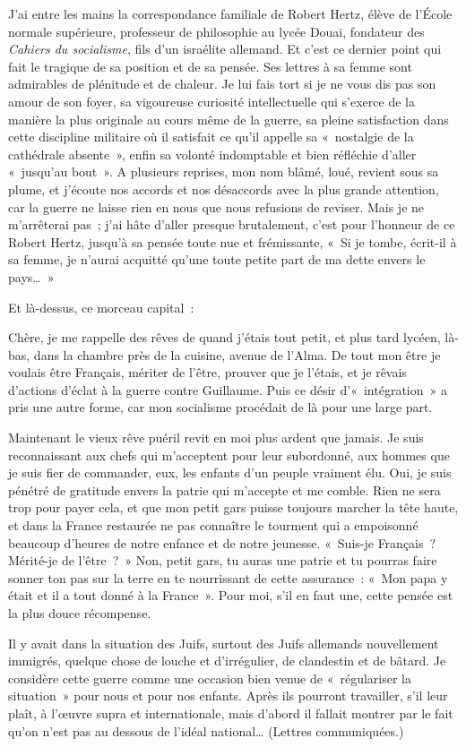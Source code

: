 \documentclass[french,twoside]{book} %
\newenvironment{quoteblock}%
  {\begin{quoting}}
  {\end{quoting}}
\newenvironment{quotebar}{%
    \def\FrameCommand{{\color{rubric!10!}\vrule width 0.5em} \hspace{0.9em}}%
    \def\OuterFrameSep{\itemsep} %
    \MakeFramed {\advance\hsize-\width \FrameRestore}
  }%
  {%
    \endMakeFramed
  }
\renewenvironment{quoteblock}%
  {%
    \savenotes
    \setstretch{0.9}
    \normalfont
    \begin{quotebar}
  }
  {%
    \end{quotebar}
    \spewnotes
  }
\begin{document}
J’ai entre les mains la correspondance familiale de Robert Hertz, élève de l’École normale supérieure, professeur de philosophie au lycée Douai, fondateur des {\itshape Cahiers du socialisme}, fils d’un israélite allemand. Et c’est ce dernier point qui fait le tragique de sa position et de sa pensée. Ses lettres à sa femme sont admirables de plénitude et de chaleur. Je lui fais tort si je ne vous dis pas son amour de son foyer, sa vigoureuse curiosité intellectuelle qui s’exerce de la manière la plus originale au cours même de la guerre, sa pleine satisfaction dans cette discipline militaire où il satisfait ce qu’il appelle sa « nostalgie de la cathédrale absente », enfin sa volonté indomptable et bien réfléchie d’aller « jusqu’au bout ». A plusieurs reprises, mon nom blâmé, loué, revient sous sa plume, et j’écoute nos accords et nos désaccords avec la plus grande attention, car la guerre ne laisse rien en nous que nous refusions de reviser. Mais je ne m’arrêterai pas ; j’ai hâte d’aller presque brutalement, c’est pour l’honneur de ce Robert Hertz, jusqu’à sa pensée toute nue et frémissante, « Si je tombe, écrit-il à sa femme, je n’aurai acquitté qu’une toute petite part de ma dette envers le pays… »‌\par
Et là-dessus, ce morceau capital :‌\par

\begin{quoteblock}
 \noindent Chère, je me rappelle des rêves de quand j’étais tout petit, et plus tard lycéen, là-bas, dans la chambre près de la cuisine, avenue de l’Alma. De tout mon être je voulais être Français, mériter de l’être, prouver que je l’étais, et je rêvais d’actions d’éclat à la guerre contre Guillaume. Puis ce désir d’« intégration » a pris une autre forme, car mon socialisme procédait de là pour une large part.‌\par
 Maintenant le vieux rêve puéril revit en moi plus ardent que jamais. Je suis reconnaissant aux chefs qui m’acceptent pour leur subordonné, aux hommes que je suis fier de commander, eux, les enfants d’un peuple vraiment élu. Oui, je suis pénétré de gratitude envers la patrie qui m’accepte et me comble. Rien ne sera trop pour payer cela, et que mon petit gars puisse toujours marcher la tête haute, et dans la France restaurée ne pas connaître le tourment qui a empoisonné beaucoup d’heures de notre enfance et de notre jeunesse. « Suis-je Français ? Mérité-je de l’être ? » Non, petit gars, tu auras une patrie et tu pourras faire sonner ton pas sur la terre en te nourrissant de cette assurance : « Mon papa y était et il a tout donné à la France ». Pour moi, s’il en faut une, cette pensée est la plus douce récompense.‌\par
 Il y avait dans la situation des Juifs, surtout des Juifs allemands nouvellement immigrés, quelque chose de louche et d’irrégulier, de clandestin et de bâtard. Je considère cette guerre comme une occasion bien venue de « régulariser la situation » pour nous et pour nos enfants. Après ils pourront travailler, s’il leur plaît, à l’œuvre supra et internationale, mais d’abord il fallait montrer par le fait qu’on n’est pas au dessous de l’idéal national… (Lettres communiquées.)‌
 \end{quoteblock}
\end{document}
